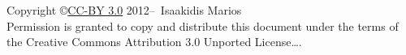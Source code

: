 \clearpage\null\vfill
\thispagestyle{empty}
\begin{center}
Copyright \copyright \href{https://creativecommons.org/licenses/by/3.0/}{CC-BY 3.0} 2012--\the\year\ Isaakidis Marios\\[0.5cm]
Permission is granted to copy and distribute this document under the terms of the Creative Commons Attribution 3.0 Unported License\ldots.
\end{center}
\clearpage